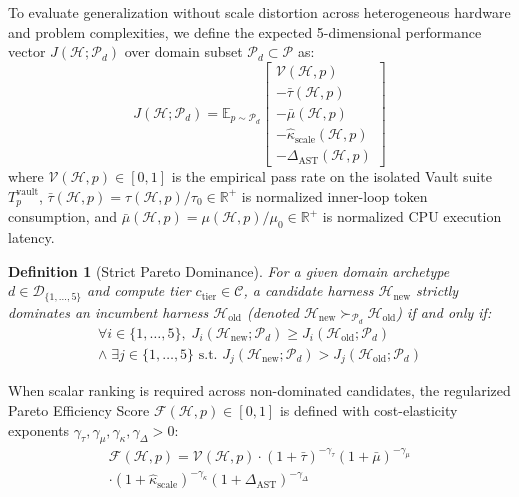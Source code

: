 \documentclass[10pt,twocolumn,letterpaper]{article}
\newtheorem{definition}{Definition}
\begin{document}
To evaluate generalization without scale distortion across heterogeneous hardware and problem complexities, we define the expected 5-dimensional performance vector $J(\mathcal{H};\mathcal{P}_{d})$ over domain subset $\mathcal{P}_{d}\subset\mathcal{P}$ as:
\begin{equation}
J(\mathcal{H};\mathcal{P}_{d}) = \mathbb{E}_{p\sim\mathcal{P}_{d}}
\begin{bmatrix}
\mathcal{V}(\mathcal{H},p) \\
-\bar{\tau}(\mathcal{H},p) \\
-\bar{\mu}(\mathcal{H},p) \\
-\hat{\kappa}_{\text{scale}}(\mathcal{H},p) \\
-\Delta_{\text{AST}}(\mathcal{H},p)
\end{bmatrix}
\end{equation}
where $\mathcal{V}(\mathcal{H},p)\in[0,1]$ is the empirical pass rate on the isolated Vault suite $T_{p}^{\text{vault}}$, $\bar{\tau}(\mathcal{H},p)=\tau(\mathcal{H},p)/\tau_{0}\in\mathbb{R}^{+}$ is normalized inner-loop token consumption, and $\bar{\mu}(\mathcal{H},p)=\mu(\mathcal{H},p)/\mu_{0}\in\mathbb{R}^{+}$ is normalized CPU execution latency.

\begin{definition}[Strict Pareto Dominance]
For a given domain archetype $d\in\mathcal{D}_{\{1,\dots,5\}}$ and compute tier $c_{\text{tier}}\in\mathcal{C}$, a candidate harness $\mathcal{H}_{\text{new}}$ strictly dominates an incumbent harness $\mathcal{H}_{\text{old}}$ (denoted $\mathcal{H}_{\text{new}}\succ_{\mathcal{P}_{d}}\mathcal{H}_{\text{old}}$) if and only if:
\begin{multline}
\forall i\in\{1,\dots,5\},\; J_{i}(\mathcal{H}_{\text{new}};\mathcal{P}_{d})\ge J_{i}(\mathcal{H}_{\text{old}};\mathcal{P}_{d}) \\
\wedge\;\exists j\in\{1,\dots,5\}\text{ s.t. } J_{j}(\mathcal{H}_{\text{new}};\mathcal{P}_{d}) > J_{j}(\mathcal{H}_{\text{old}};\mathcal{P}_{d})
\end{multline}
\end{definition}

When scalar ranking is required across non-dominated candidates, the regularized Pareto Efficiency Score $\mathcal{F}(\mathcal{H},p)\in[0,1]$ is defined with cost-elasticity exponents $\gamma_{\tau},\gamma_{\mu},\gamma_{\kappa},\gamma_{\Delta}>0$:
\begin{multline}
\mathcal{F}(\mathcal{H},p) = \mathcal{V}(\mathcal{H},p)\cdot(1+\bar{\tau})^{-\gamma_{\tau}}(1+\bar{\mu})^{-\gamma_{\mu}} \\
\cdot(1+\hat{\kappa}_{\text{scale}})^{-\gamma_{\kappa}}(1+\Delta_{\text{AST}})^{-\gamma_{\Delta}}
\end{multline}
\end{document}
